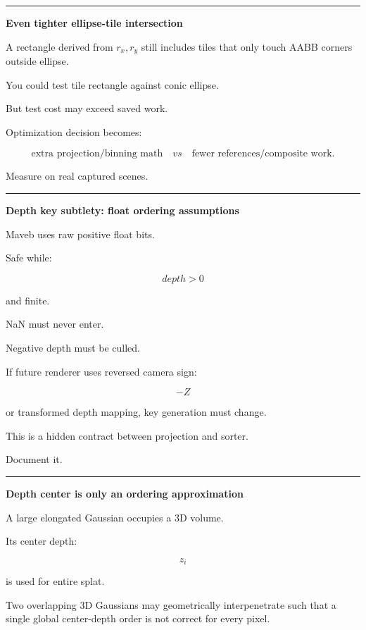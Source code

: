 \begin{center}\rule{0.5\linewidth}{0.5pt}\end{center}

\textbf{Even tighter ellipse-tile intersection}

A rectangle derived from \(r_x,r_y\) still includes tiles that only touch AABB corners outside ellipse.

You could test tile rectangle against conic ellipse.

But test cost may exceed saved work.

Optimization decision becomes:

\[
\boxed{
\text{extra projection/binning math}
\quad vs\quad
\text{fewer references/composite work}.
}
\]

Measure on real captured scenes.

\begin{center}\rule{0.5\linewidth}{0.5pt}\end{center}

\textbf{Depth key subtlety: float ordering assumptions}

Maveb uses raw positive float bits.

Safe while:

\[
depth>0
\]

and finite.

NaN must never enter.

Negative depth must be culled.

If future renderer uses reversed camera sign:

\[
-Z
\]

or transformed depth mapping, key generation must change.

This is a hidden contract between projection and sorter.

Document it.

\begin{center}\rule{0.5\linewidth}{0.5pt}\end{center}

\textbf{Depth center is only an ordering approximation}

A large elongated Gaussian occupies a 3D volume.

Its center depth:

\[
z_i
\]

is used for entire splat.

Two overlapping 3D Gaussians may geometrically interpenetrate such that a single global center-depth order is not correct for every pixel.

